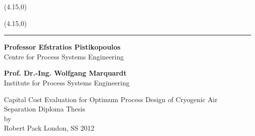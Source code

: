 
\vspace*{-1.0cm} \thispagestyle{empty}
\begin{minipage}[b]{17cm}
\begin{minipage}[b]{8.5cm}
	\begin{picture}(4.15,0)
	\end{picture}
\end{minipage}
\begin{minipage}[b]{6.95cm}
	\begin{flushright}
		\begin{picture}(4.15,0)
		\end{picture}
	\end{flushright}
\end{minipage}
\end{minipage}
\rule{\textwidth}{0.5pt}

\begin{minipage}[b]{8.5cm}
	\begin{flushleft}
		\textcolor{ImperialLightBlue}{
		\textbf{Professor  Efstratios  Pistikopoulos} \\ Centre for Process Systems Engineering}
	\end{flushleft}
\end{minipage}
\begin{minipage}[b]{8.3cm}
	\begin{flushright}
		\textcolor{ImperialLightBlue}{
		\textbf{Prof. Dr.-Ing. Wolfgang Marquardt} \\ Institute for Process Systems Engineering}
	\end{flushright}
\end{minipage}




\begin{center}
	\vspace{3cm}
	 \Huge  Capital Cost Evaluation for Optimum Process Design of Cryogenic Air Separation
	\vspace{1cm}
	 \vfill \LARGE
	{Diploma Thesis\\
	by\\
	Robert Pack} \vfill{London, SS 2012}
\end{center}

